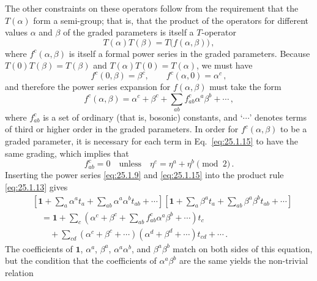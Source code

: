 The other constraints on these operators follow from the requirement that the
$T(\alpha)$ form a semi-group; that is, that the product of the operators for
different values $\alpha$ and $\beta$ of the graded parameters is itself a
$T$-operator
\begin{equation}
  T(\alpha)T(\beta)=T\bigl(f(\alpha,\beta)\bigr)\,,
  \tag{25.1.13}\label{eq:25.1.13}
\end{equation}
where $f^c(\alpha,\beta)$ is itself a formal power series in the graded
parameters. Because $T(0)T(\beta)=T(\beta)$ and
$T(\alpha)T(0)=T(\alpha)$, we must have
\begin{equation}
  f^c(0,\beta)=\beta^c,\qquad
  f^c(\alpha,0)=\alpha^c\,,
  \tag{25.1.14}\label{eq:25.1.14}
\end{equation}
and therefore the power series expansion for $f(\alpha,\beta)$ must take the
form
\begin{equation}
  f^c(\alpha,\beta)=\alpha^c+\beta^c
  +\sum_{ab}f^c_{ab}\alpha^a\beta^b+\cdots\,,
  \tag{25.1.15}\label{eq:25.1.15}
\end{equation}
where $f^c_{ab}$ is a set of ordinary (that is, bosonic) constants, and
`$\cdots$' denotes terms of third or higher order in the graded parameters. In
order for $f^c(\alpha,\beta)$ to be a graded parameter, it is necessary for
each term in Eq.~\eqref{eq:25.1.15} to have the same grading, which implies
that
\begin{equation}
  f^c_{ab}=0\quad\text{unless}\quad
  \eta^c=\eta^a+\eta^b\pmod 2\,.
  \tag{25.1.16}\label{eq:25.1.16}
\end{equation}
Inserting the power series \eqref{eq:25.1.9} and \eqref{eq:25.1.15} into the
product rule \eqref{eq:25.1.13} gives
\[
  \begin{aligned}
  &\left[\mathbf{1}+\sum_a\alpha^at_a
    +\sum_{ab}\alpha^a\alpha^bt_{ab}+\cdots\right]
   \left[\mathbf{1}+\sum_a\beta^at_a
    +\sum_{ab}\beta^a\beta^bt_{ab}+\cdots\right]
  \\
  &\quad=\mathbf{1}
    +\sum_c\left(\alpha^c+\beta^c
      +\sum_{ab}f^c_{ab}\alpha^a\beta^b+\cdots\right)t_c
  \\
  &\qquad
    +\sum_{cd}\left(\alpha^c+\beta^c+\cdots\right)
      \left(\alpha^d+\beta^d+\cdots\right)t_{cd}+\cdots\,.
  \end{aligned}
\]
The coefficients of $\mathbf{1}$, $\alpha^a$, $\beta^a$,
$\alpha^a\alpha^b$, and $\beta^a\beta^b$ match on both sides of this
equation, but the condition that the coefficients of $\alpha^a\beta^b$ are
the same yields the non-trivial relation
